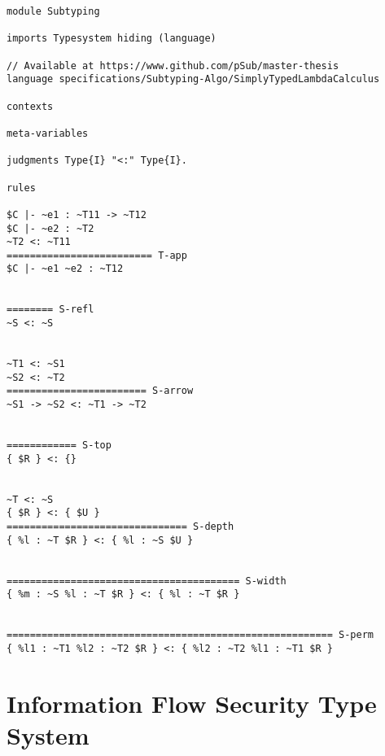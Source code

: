 \begin{lstlisting}[language=sltc]
module Subtyping

imports Typesystem hiding (language)

// Available at https://www.github.com/pSub/master-thesis
language specifications/Subtyping-Algo/SimplyTypedLambdaCalculus

contexts

meta-variables

judgments Type{I} "<:" Type{I}.

rules

$C |- ~e1 : ~T11 -> ~T12
$C |- ~e2 : ~T2
~T2 <: ~T11
========================= T-app
$C |- ~e1 ~e2 : ~T12


======== S-refl
~S <: ~S


~T1 <: ~S1
~S2 <: ~T2    
======================== S-arrow 
~S1 -> ~S2 <: ~T1 -> ~T2


============ S-top
{ $R } <: {}


~T <: ~S
{ $R } <: { $U }
=============================== S-depth
{ %l : ~T $R } <: { %l : ~S $U }


======================================== S-width
{ %m : ~S %l : ~T $R } <: { %l : ~T $R }


======================================================== S-perm
{ %l1 : ~T1 %l2 : ~T2 $R } <: { %l2 : ~T2 %l1 : ~T1 $R }
\end{lstlisting}
\newpage
\section{Information Flow Security Type System}
\label{sec:inform-flow-secur}

